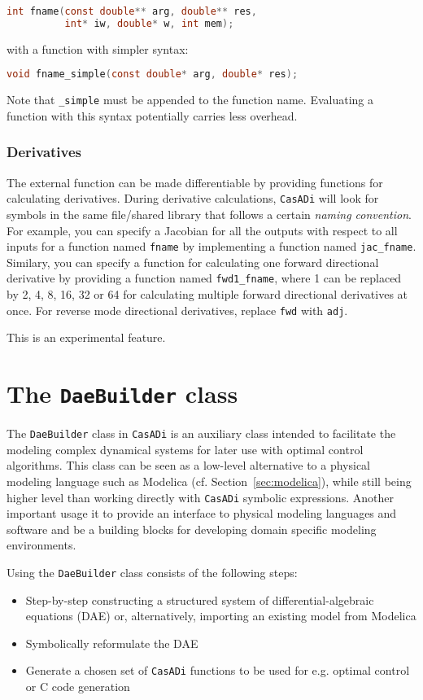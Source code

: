 \documentclass[a4paper,12pt]{book}
\newcommand{\CasADi}{\texttt{CasADi}\xspace}
\begin{document}
\begin{lstlisting}[language=C]
int fname(const double** arg, double** res,
          int* iw, double* w, int mem);
\end{lstlisting}

with a function with simpler syntax:
\begin{lstlisting}[language=C]
void fname_simple(const double* arg, double* res);
\end{lstlisting}

Note that \verb|_simple| must be appended to the function name. Evaluating
a function with this syntax potentially carries less overhead.

\subsection*{Derivatives}
The external function can be made differentiable by providing functions for
calculating derivatives. During derivative calculations, \CasADi will look for
symbols in the same file/shared library that follows a certain
\emph{naming convention}. For example, you can specify a Jacobian for all the
outputs with respect to all inputs for a function named \verb|fname| by
implementing a function named \verb|jac_fname|. Similary, you can specify
a function for calculating one forward directional derivative by providing a
function named \verb|fwd1_fname|, where 1 can be replaced by 2, 4, 8, 16,
32 or 64 for calculating multiple forward directional derivatives at once.
For reverse mode directional derivatives, replace \verb|fwd| with \verb|adj|.

This is an experimental feature.

\chapter{The \texttt{DaeBuilder} class} \label{ch:daebuilder}
The \texttt{DaeBuilder} class in \CasADi is an auxiliary class intended to
facilitate the modeling complex dynamical systems for later use with optimal
control algorithms. This class can be seen as a low-level alternative to
a physical modeling language such as Modelica (cf. Section~\ref{sec:modelica}),
while still being higher level than working directly with \CasADi symbolic
expressions. Another important usage it to provide an interface to
physical modeling languages and software and be a building blocks for
developing domain specific modeling environments.

Using the \texttt{DaeBuilder} class consists of the following steps:
\begin{itemize}
  \item Step-by-step constructing a structured system of differential-algebraic
  equations (DAE) or, alternatively, importing an existing model from Modelica
  \item Symbolically reformulate the DAE
  \item Generate a chosen set of \CasADi functions to be used for e.g. optimal
  control or C code generation
\end{itemize}
\end{document}
